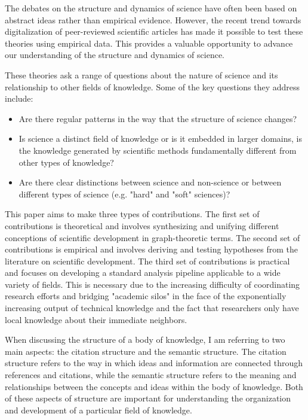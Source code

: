 The debates on the structure and dynamics of science have often been based on abstract ideas rather than 
empirical evidence. However, the recent trend towards digitalization of peer-reviewed scientific articles 
has made it possible to test these theories using empirical data. This provides a valuable opportunity to 
advance our understanding of the structure and dynamics of science.

These theories ask a range of questions about the nature of science and its relationship to other fields 
of knowledge. Some of the key questions they address include: 
\begin{itemize}
    \item Are there regular patterns in the way that the structure of science changes?
    \item Is science a distinct field of knowledge or is it embedded in larger domains, is the 
    knowledge generated by scientific methods fundamentally different from other types of knowledge?
    \item Are there clear distinctions between science and non-science or between different types of 
    science (e.g. "hard" and "soft" sciences)? 
\end{itemize}

This paper aims to make three types of contributions. The first set of contributions is theoretical 
and involves synthesizing and unifying different conceptions of scientific development in graph-theoretic 
terms. The second set of contributions is empirical and involves deriving and testing hypotheses from the 
literature on scientific development. The third set of contributions is practical and focuses on developing 
a standard analysis pipeline applicable to a wide variety of fields. This is necessary due to the increasing 
difficulty of coordinating research efforts and bridging "academic silos" in the face of the exponentially 
increasing output of technical knowledge and the fact that researchers only have local knowledge about their 
immediate neighbors.

When discussing the structure of a body of knowledge, I am referring to two main aspects: the citation 
structure and the semantic structure. The citation structure refers to the way in which ideas and information 
are connected through references and citations, while the semantic structure refers to the meaning and relationships 
between the concepts and ideas within the body of knowledge. Both of these aspects of structure are important for 
understanding the organization and development of a particular field of knowledge.